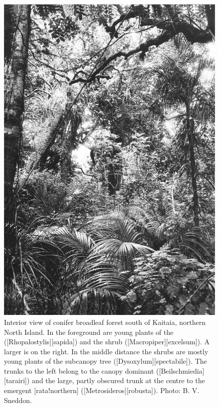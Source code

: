 {\begin{figure}[!t]
\begin{minipage}[t]{\textwidth}
\begin{minipage}[t]{(\textwidth-\fgap) * \real{0.456}}
				\includegraphics[width=\textwidth]{graphics/figure8conifer.jpg}
				\caption[Interior view of conifer broadleaf forest south of Kaitaia]{Interior view of conifer broadleaf forest south of Kaitaia, northern North Island.
				In the foreground are young plants of the  ([Rhopalostylis][sapida]) and the shrub  ([excelsum]).
				A larger  is on the right.
				In the middle distance the shrubs are mostly young plants of the subcanopy tree  ([Dysoxylum][spectabile]).
				The trunks to the left belong to the canopy dominant  ([Beilschmiedia][tarairi]) and the large, partly obscured trunk at the centre to the emergent [rata!northern] ([Metrosideros][robusta]).
				Photo: B. V. Sneddon.}%
				\label{fig:8conifer}
			\end{minipage}
		\end{minipage}
	\end{figure}
}

